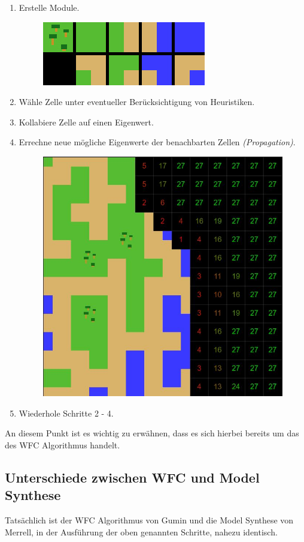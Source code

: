 \documentclass[12pt, a4paper,twoside,openright]{report} %
\begin{document}
\begin{enumerate}
    \itemsep-1em
    \item Erstelle Module.
    \begin{figure}[H]
        \centering
        \includegraphics[width=0.4\linewidth]{images/modules-cells.JPG}
    \end{figure}
    \item Wähle Zelle unter eventueller Berücksichtigung von Heuristiken.
    \item Kollabiere Zelle auf einen Eigenwert.
    \item Errechne neue mögliche Eigenwerte der benachbarten Zellen \textit{(Propagation)}.
    \begin{figure}[H]
        \centering
        \includegraphics[width=0.6\linewidth]{images/collapse-cells.JPG}
    \end{figure}
    \item Wiederhole Schritte 2 - 4.
\end{enumerate}

An diesem Punkt ist es wichtig zu erwähnen,
dass es sich hierbei bereits um das  des WFC Algorithmus handelt.

\subsection{Unterschiede zwischen WFC und Model Synthese}

Tatsächlich ist der WFC Algorithmus von Gumin und die Model Synthese von Merrell, in der Ausführung der oben genannten Schritte, nahezu identisch.
\end{document}
